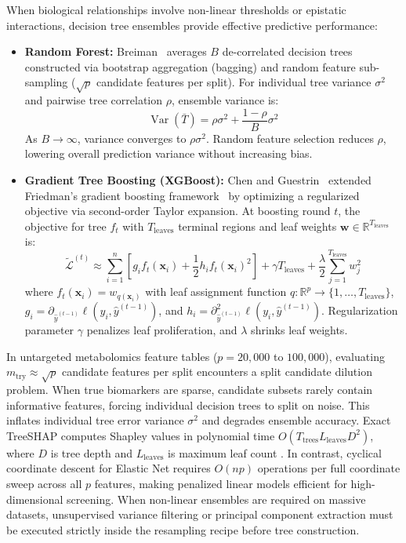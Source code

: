 \documentclass[11pt,oneside]{book}
\begin{document}
When biological relationships involve non-linear thresholds or epistatic interactions, decision tree ensembles provide effective predictive performance:
\begin{itemize}
    \item \textbf{Random Forest:} Breiman~\cite{breiman2001random} averages $B$ de-correlated decision trees constructed via bootstrap aggregation (bagging) and random feature sub-sampling ($\sqrt{p}$ candidate features per split). For individual tree variance $\sigma^2$ and pairwise tree correlation $\rho$, ensemble variance is:
    \begin{equation}
    \operatorname{Var}(\bar{T}) = \rho \sigma^2 + \frac{1 - \rho}{B}\sigma^2
    \end{equation}
    As $B \to \infty$, variance converges to $\rho \sigma^2$. Random feature selection reduces $\rho$, lowering overall prediction variance without increasing bias.
    \item \textbf{Gradient Tree Boosting (XGBoost):} Chen and Guestrin~\cite{chen2016xgboost} extended Friedman's gradient boosting framework~\cite{friedman2001greedy} by optimizing a regularized objective via second-order Taylor expansion. At boosting round $t$, the objective for tree $f_t$ with $T_{\text{leaves}}$ terminal regions and leaf weights $\mathbf{w} \in \mathbb{R}^{T_{\text{leaves}}}$ is:
    \begin{equation}
    \tilde{\mathcal{L}}^{(t)} \approx \sum_{i=1}^n \left[ g_i f_t(\mathbf{x}_i) + \frac{1}{2} h_i f_t(\mathbf{x}_i)^2 \right] + \gamma T_{\text{leaves}} + \frac{\lambda}{2} \sum_{j=1}^{T_{\text{leaves}}} w_j^2
    \end{equation}
    where $f_t(\mathbf{x}_i) = w_{q(\mathbf{x}_i)}$ with leaf assignment function $q: \mathbb{R}^p \to \{1, \dots, T_{\text{leaves}}\}$, $g_i = \partial_{\hat{y}^{(t-1)}} \ell(y_i, \hat{y}^{(t-1)})$, and $h_i = \partial^2_{\hat{y}^{(t-1)}} \ell(y_i, \hat{y}^{(t-1)})$. Regularization parameter $\gamma$ penalizes leaf proliferation, and $\lambda$ shrinks leaf weights.
\end{itemize}

In untargeted metabolomics feature tables ($p = 20{,}000$ to $100{,}000$), evaluating $m_{\text{try}} \approx \sqrt{p}$ candidate features per split encounters a split candidate dilution problem. When true biomarkers are sparse, candidate subsets rarely contain informative features, forcing individual decision trees to split on noise. This inflates individual tree error variance $\sigma^2$ and degrades ensemble accuracy. Exact TreeSHAP computes Shapley values in polynomial time $O(T_{\text{trees}} L_{\text{leaves}} D^2)$, where $D$ is tree depth and $L_{\text{leaves}}$ is maximum leaf count \cite{lundberg2020local}. In contrast, cyclical coordinate descent for Elastic Net requires $O(n p)$ operations per full coordinate sweep across all $p$ features, making penalized linear models efficient for high-dimensional screening. When non-linear ensembles are required on massive datasets, unsupervised variance filtering or principal component extraction must be executed strictly inside the resampling recipe before tree construction.
\end{document}
